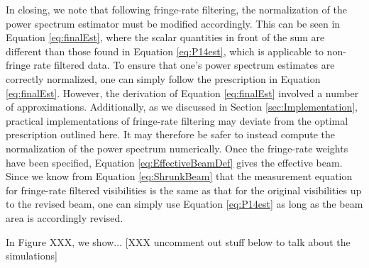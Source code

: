 \documentclass[twocolumn,apj,numberedappendix]{emulateapj}
\begin{document}
In closing, we note that following fringe-rate filtering, the normalization of the power spectrum estimator must be modified accordingly. This can be seen in Equation \eqref{eq:finalEst}, where the scalar quantities in front of the sum are different than those found in Equation \eqref{eq:P14est}, which is applicable to non-fringe rate filtered data. To ensure that one's power spectrum estimates are correctly normalized, one can simply follow the prescription in Equation \eqref{eq:finalEst}. However, the derivation of Equation \eqref{eq:finalEst} involved a number of approximations. Additionally, as we discussed in Section \ref{sec:Implementation}, practical implementations of fringe-rate filtering may deviate from the optimal prescription outlined here. It may therefore be safer to instead compute the normalization of the power spectrum numerically. Once the fringe-rate weights have been specified, Equation \eqref{eq:EffectiveBeamDef} gives the effective beam. Since we know from Equation \eqref{eq:ShrunkBeam} that the measurement equation for fringe-rate filtered visibilities is the same as that for the original visibilities up to the revised beam, one can simply use Equation \eqref{eq:P14est} as long as the beam area is accordingly revised.

In Figure XXX, we show... [XXX uncomment out stuff below to talk about the simulations]
%
\end{document}

